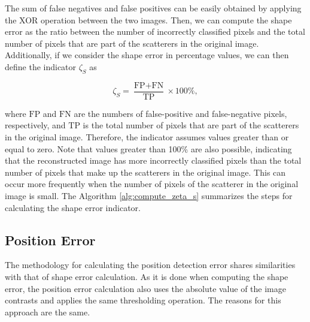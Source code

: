 \documentclass{IEEEtran}
\begin{document}
            The sum of false negatives and false positives can be easily obtained by applying the XOR operation between the two images. Then, we can compute the shape error as the ratio between the number of incorrectly classified pixels and the total number of pixels that are part of the scatterers in the original image. Additionally, if we consider the shape error in percentage values, we can then define the indicator $\zeta_S$ as

            \begin{equation}
                \zeta_S = \frac{\text{FP} + \text{FN}}{\text{TP}} \times 100\%, \label{eq:shapeerror}
            \end{equation}

            \noindent where $\text{FP}$ and $\text{FN}$ are the numbers of false-positive and false-negative pixels, respectively, and $\text{TP}$ is the total number of pixels that are part of the scatterers in the original image. Therefore, the indicator assumes values greater than or equal to zero. Note that values greater than 100\% are also possible, indicating that the reconstructed image has more incorrectly classified pixels than the total number of pixels that make up the scatterers in the original image. This can occur more frequently when the number of pixels of the scatterer in the original image is small. The Algorithm \ref{alg:compute_zeta_s} summarizes the steps for calculating the shape error indicator.

            
            			
		\subsection{Position Error}\label{sec:indicators:positionerror}


            The methodology for calculating the position detection error shares similarities with that of shape error calculation. As it is done when computing the shape error, the position error calculation also uses the absolute value of the image contrasts and applies the same thresholding operation. The reasons for this approach are the same.
            
\end{document}
